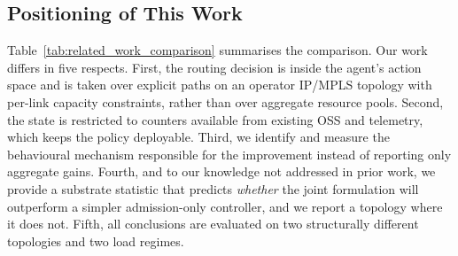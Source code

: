 \documentclass[10pt,journal,comsoc]{IEEEtran}
\begin{document}
\subsection{Positioning of This Work}
Table~\ref{tab:related_work_comparison} summarises the comparison. Our
work differs in five respects. First, the routing decision is inside the
agent's action space and is taken over explicit paths on an operator
IP/MPLS topology with per-link capacity constraints, rather than over
aggregate resource pools. Second, the state is restricted to counters
available from existing OSS and telemetry, which keeps the policy
deployable. Third, we identify and measure the behavioural mechanism
responsible for the improvement instead of reporting only aggregate
gains. Fourth, and to our knowledge not addressed in prior work, we
provide a substrate statistic that predicts \emph{whether} the joint
formulation will outperform a simpler admission-only controller, and we
report a topology where it does not. Fifth, all conclusions are
evaluated on two structurally different topologies and two load regimes.
\end{document}
